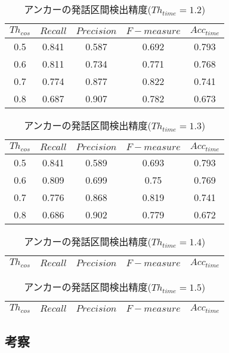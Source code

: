 \begin{table}[H]
  \begin{center}
    \caption{アンカーの発話区間検出精度($Th_{time}=1.2$) \label{table:result_get_anchor12}}
    \begin{tabular}{|c||c|c|c|c|} \hline
      $Th_{cos}$ & $Recall$ & $Precision$ & $F-measure$ & $Acc_{time}$\\ \hline
0.5 & 0.841 & 0.587 & 0.692 & 0.793 \\ \hline
0.6 & 0.811 & 0.734 & 0.771 & 0.768 \\ \hline
0.7 & 0.774 & 0.877 & 0.822 & 0.741 \\ \hline
0.8 & 0.687 & 0.907 & 0.782 & 0.673 \\ \hline

    \end{tabular}
  \end{center}
\end{table}

\begin{table}[H]
  \begin{center}
    \caption{アンカーの発話区間検出精度($Th_{time}=1.3$) \label{table:result_get_anchor13}}
    \begin{tabular}{|c||c|c|c|c|} \hline
      $Th_{cos}$ & $Recall$ & $Precision$ & $F-measure$ & $Acc_{time}$\\ \hline
0.5 & 0.841 & 0.589 & 0.693 & 0.793 \\ \hline
0.6 & 0.809 & 0.699 & 0.75 & 0.769 \\ \hline
0.7 & 0.776 & 0.868 & 0.819 & 0.741 \\ \hline
0.8 & 0.686 & 0.902 & 0.779 & 0.672 \\ \hline

    \end{tabular}
  \end{center}
\end{table}

\begin{table}[H]
  \begin{center}
    \caption{アンカーの発話区間検出精度($Th_{time}=1.4$) \label{table:result_get_anchor14}}
    \begin{tabular}{|c||c|c|c|c|} \hline
      $Th_{cos}$ & $Recall$ & $Precision$ & $F-measure$ & $Acc_{time}$\\ \hline


    \end{tabular}
  \end{center}
\end{table}

\begin{table}[H]
  \begin{center}
    \caption{アンカーの発話区間検出精度($Th_{time}=1.5$) \label{table:result_get_anchor15}}
    \begin{tabular}{|c||c|c|c|c|} \hline
      $Th_{cos}$ & $Recall$ & $Precision$ & $F-measure$ & $Acc_{time}$\\ \hline


    \end{tabular}
  \end{center}
\end{table}
\subsection{考察}
